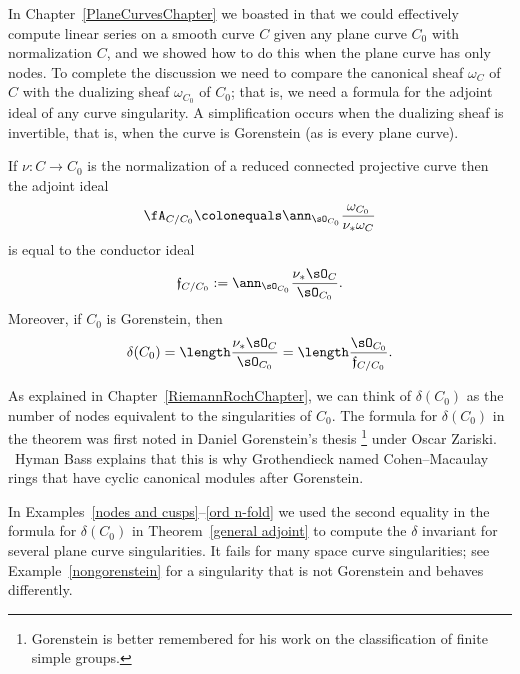 In Chapter~\ref{PlaneCurvesChapter} we boasted in that we could
effectively compute
linear series on a smooth curve $C$ given any plane curve $C_0$ with
normalization $C$,
and we showed how to do this when the plane curve has only nodes. To
complete the discussion
we need to compare the canonical sheaf $\omega_{C}$ of $C$ with
the dualizing sheaf $\omega_{C_{0}}$ of $C_0$; 
that is, we need a formula for the adjoint ideal of any
curve singularity. A simplification occurs when the dualizing sheaf is
invertible, that is, when the curve is Gorenstein (as is every plane curve).

\begin{theorem}\label{general adjoint}
If $\nu: C \to C_0$ is the normalization of a reduced connected projective
curve then the
adjoint ideal
$$
\fA_{C/C_0} \colonequals \ann_{\sO_{C_0}}\frac{\omega_{C_0}}{\nu_*
\omega_C}
$$
is equal to the conductor ideal
$$
\mathfrak f_{C/C_0}: = \ann_{\sO_{C_0}}\frac{\nu_* \sO_C}{\sO_{C_0}}
.
$$
Moreover, if $C_0$ is Gorenstein, then
$$
\delta(C_0) = \length \frac{\nu_* \sO_C}{\sO_{C_0}} = \length \frac
{\sO_{C_0}}{\mathfrak f_{C/C_0}}.
$$
\end{theorem}

As explained in Chapter~\ref{RiemannRochChapter},
we can think of
$\delta(C_0)$ as the number of nodes equivalent to the
singularities of $C_0$. 	
The formula for $\delta(C_0)$ in 
the theorem was first noted in Daniel Gorenstein's thesis%
\footnote{Gorenstein is better remembered for his
work on the classification of finite simple groups.} 
%
%
under 
Oscar Zariski.%
\ Hyman Bass
%
\citeyear{Bass}
explains that this is why
%
Grothendieck
named Cohen--Macaulay rings that have
cyclic canonical modules
%
%
after Gorenstein.

In Examples~\ref{nodes and cusps}--\ref{ord n-fold} we used the second equality in the formula for $\delta(C_{0})$ in Theorem~\ref{general adjoint} to compute the $\delta$ invariant for
several plane curve singularities. It fails for many space curve singularities; see
Example~\ref{nongorenstein} for a singularity that is not Gorenstein
and behaves differently.

